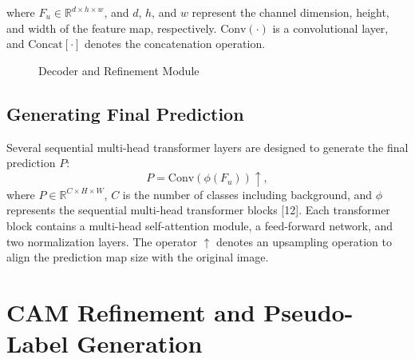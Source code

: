 where \( F_u \in \mathbb{R}^{d \times h \times w} \), and \( d \), \( h \), and \( w \) represent the channel dimension, height, and width of the feature map, respectively. \(\text{Conv}(\cdot)\) is a convolutional layer, and \(\text{Concat}[\cdot]\) denotes the concatenation operation.


\begin{figure}[t]
    \centering
    \caption{Decoder and Refinement Module}
    \label{fig:decoder}
\end{figure}

\subsection{Generating Final Prediction}
\label{subsec:decoder_final_pred}

Several sequential multi-head transformer layers are designed to generate the final prediction \( P \):
\begin{equation}
    \label{eq:prediction}
    P = \text{Conv}(\phi(F_u)) \uparrow,
\end{equation}
where \( P \in \mathbb{R}^{C \times H \times W} \), \( C \) is the number of classes including background, and \(\phi\) represents the sequential multi-head transformer blocks [12]. Each transformer block contains a multi-head self-attention module, a feed-forward network, and two normalization layers. The operator \(\uparrow\) denotes an upsampling operation to align the prediction map size with the original image.


\section{CAM Refinement and Pseudo-Label Generation}
\label{sec:refinement}
